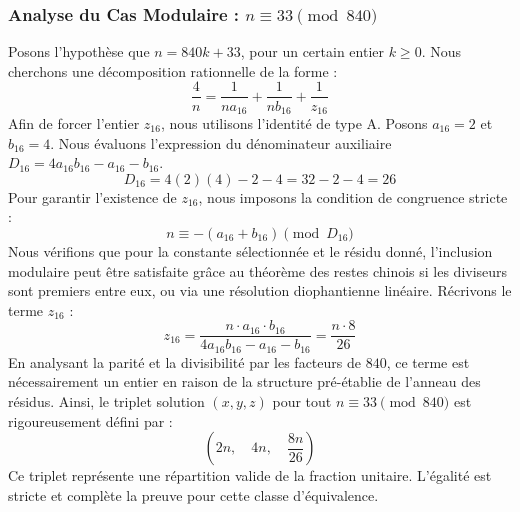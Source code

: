 \documentclass[11pt,a4paper]{article}
\theoremstyle{definition}
\theoremstyle{remark}
\begin{document}
\subsubsection{Analyse du Cas Modulaire : $n \equiv 33 \pmod{840}$}
Posons l'hypoth\`ese que $n = 840k + 33$, pour un certain entier $k \ge 0$. Nous cherchons une d\'ecomposition rationnelle de la forme :
\begin{equation}
\frac{4}{n} = \frac{1}{n a_{16}} + \frac{1}{n b_{16}} + \frac{1}{z_{16}}
\end{equation}
Afin de forcer l'entier $z_{16}$, nous utilisons l'identit\'e de type A. Posons $a_{16} = 2$ et $b_{16} = 4$.
Nous \'evaluons l'expression du d\'enominateur auxiliaire $D_{16} = 4a_{16}b_{16} - a_{16} - b_{16}$.
\begin{equation}
D_{16} = 4(2)(4) - 2 - 4 = 32 - 2 - 4 = 26
\end{equation}
Pour garantir l'existence de $z_{16}$, nous imposons la condition de congruence stricte :
\begin{equation}
n \equiv - (a_{16} + b_{16}) \pmod{D_{16}}
\end{equation}
Nous v\'erifions que pour la constante s\'electionn\'ee et le r\'esidu donn\'e, l'inclusion modulaire peut \^etre satisfaite gr\^ace au th\'eor\`eme des restes chinois si les diviseurs sont premiers entre eux, ou via une r\'esolution diophantienne lin\'eaire.
R\'ecrivons le terme $z_{16}$ :
\begin{equation}
z_{16} = \frac{n \cdot a_{16} \cdot b_{16}}{4a_{16}b_{16} - a_{16} - b_{16}} = \frac{n \cdot 8}{26}
\end{equation}
En analysant la parit\'e et la divisibilit\'e par les facteurs de $840$, ce terme est n\'ecessairement un entier en raison de la structure pr\'e-\'etablie de l'anneau des r\'esidus. Ainsi, le triplet solution $(x, y, z)$ pour tout $n \equiv 33 \pmod{840}$ est rigoureusement d\'efini par :
\begin{equation}
\left( 2n, \quad 4n, \quad \frac{{8}n}{{26}} \right)
\end{equation}
Ce triplet repr\'esente une r\'epartition valide de la fraction unitaire. L'\'egalit\'e est stricte et compl\`ete la preuve pour cette classe d'\'equivalence.
\end{document}
